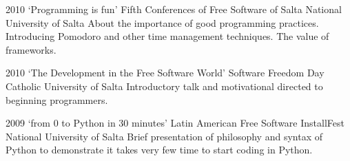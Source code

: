 \documentclass[11pt,a4paper]{moderncv}
\begin{document}
\cventry                                                                         %
    {2010}                                                                       %
    {`Programming is fun'}                                                       %
    {Fifth Conferences of Free Software of Salta}                                %
    {National University of Salta}                                               %
    {}                                                                           %
    {                                                                            %
        About the importance of good programming practices.                      %
        Introducing Pomodoro and other time management techniques.               %
        The value of frameworks.                                                 %
    }                                                                            %

\cventry                                                                         %
    {2010}                                                                       %
    {`The Development in the Free Software World'}                               %
    {Software Freedom Day}                                                       %
    {Catholic University of Salta}                                               %
    {}                                                                           %
    {                                                                            %
        Introductory talk and motivational directed to beginning programmers.    %
    }                                                                            %

\cventry                                                                         %
    {2009}                                                                       %
    {`from 0 to Python in 30 minutes'}                                           %
    {Latin American Free Software InstallFest}                                   %
    {National University of Salta}                                               %
    {}                                                                           %
    {                                                                            %
        Brief presentation of philosophy and syntax of Python                    %
        to demonstrate it takes very few time to start                           %
        coding in Python.                                                        %
    }                                                                            %
\end{document}
